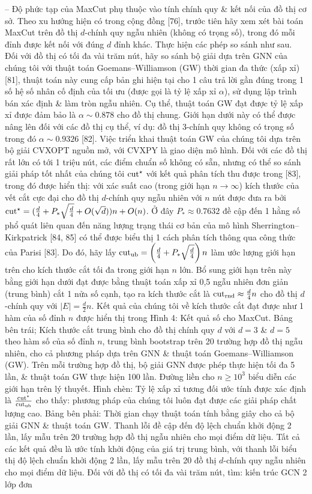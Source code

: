 \documentclass{article}
\begin{document}
\begin{itemize}
    -- Độ phức tạp của MaxCut phụ thuộc vào tính chính quy \& kết nối của đồ thị cơ sở. Theo xu hướng hiện có trong cộng đồng [76], trước tiên hãy xem xét bài toán MaxCut trên đồ thị $d$-chính quy ngẫu nhiên (không có trọng số), trong đó mỗi đỉnh được kết nối với đúng $d$ đỉnh khác. Thực hiện các phép so sánh như sau. Đối với đồ thị có tối đa vài trăm nút, hãy so sánh bộ giải dựa trên GNN của chúng tôi với thuật toán Goemans--Williamson (GW) thời gian đa thức (xấp xỉ) [81], thuật toán này cung cấp bản ghi hiện tại cho 1 câu trả lời gần đúng trong 1 số hệ số nhân cố định của tối ưu (được gọi là tỷ lệ xấp xỉ $\alpha$), sử dụng lập trình bán xác định \& làm tròn ngẫu nhiên. Cụ thể, thuật toán GW đạt được tỷ lệ xấp xỉ được đảm bảo là $\alpha\sim0.878$ cho đồ thị chung. Giới hạn dưới này có thể được nâng lên đối với các đồ thị cụ thể, ví dụ: đồ thị 3-chính quy không có trọng số trong đó $\alpha\sim0.9326$ [82]. Việc triển khai thuật toán GW của chúng tôi dựa trên bộ giải CVXOPT nguồn mở, với CVXPY là giao diện mô hình. Đối với các đồ thị rất lớn có tới 1 triệu nút, các điểm chuẩn số không có sẵn, nhưng có thể so sánh giải pháp tốt nhất của chúng tôi ${\rm cut}^\star$ với kết quả phân tích thu được trong [83], trong đó được hiển thị: với xác suất cao (trong giới hạn $n\to\infty$) kích thước của vết cắt cực đại cho đồ thị $d$-chính quy ngẫu nhiên với $n$ nút được đưa ra bởi ${\rm cut}^\star = (\frac{d}{4} + P_*\sqrt{\frac{d}{4}} + O(\sqrt{d}))n + O(n)$. Ở đây $P_*\approx0.7632$ đề cập đến 1 hằng số phổ quát liên quan đến năng lượng trạng thái cơ bản của mô hình Sherrington--Kirkpatrick [84, 85] có thể được biểu thị 1 cách phân tích thông qua công thức của Parisi [83]. Do đó, hãy lấy ${\rm cut}_{\rm ub} = \left(\frac{d}{4} + P_*\sqrt{\frac{d}{4}}\right)n$ làm ước lượng giới hạn trên cho kích thước cắt tối đa trong giới hạn $n$ lớn. Bổ sung giới hạn trên này bằng giới hạn dưới đạt được bằng thuật toán xấp xỉ 0,5 ngẫu nhiên đơn giản (trung bình) cắt 1 nửa số cạnh, tạo ra kích thước cắt là ${\rm cut}_{\rm rnd}\approx\frac{d}{4}n$ cho đồ thị $d$-chính quy với $|E| = \frac{d}{2}n$. Kết quả của chúng tôi về kích thước cắt đạt được như 1 hàm của số đỉnh $n$ được hiển thị trong {\sf Hình 4: Kết quả số cho MaxCut. Bảng bên trái; Kích thước cắt trung bình cho đồ thị chính quy $d$ với $d = 3$ \& $d = 5$ theo hàm số của số đỉnh $n$, trung bình bootstrap trên 20 trường hợp đồ thị ngẫu nhiên, cho cả phương pháp dựa trên GNN \& thuật toán Goemans--Williamson (GW). Trên mỗi trường hợp đồ thị, bộ giải GNN được phép thực hiện tối đa 5 lần, \& thuật toán GW thực hiện 100 lần. Đường liền cho $n\ge10^3$ biểu diễn các giới hạn trên lý thuyết. Hình chèn: Tỷ lệ xấp xỉ tương đối ước tính được xác định là $\frac{{\rm cut}^\star}{{\rm cut}_{\rm ub}}$ cho thấy: phương pháp của chúng tôi luôn đạt được các giải pháp chất lượng cao. Bảng bên phải: Thời gian chạy thuật toán tính bằng giây cho cả bộ giải GNN \& thuật toán GW. Thanh lỗi đề cập đến độ lệch chuẩn khởi động 2 lần, lấy mẫu trên 20 trường hợp đồ thị ngẫu nhiên cho mọi điểm dữ liệu.} Tất cả các kết quả đều là ước tính khởi động của giá trị trung bình, với thanh lỗi biểu thị độ lệch chuẩn khởi động 2 lần, lấy mẫu trên 20 đồ thị $d$-chính quy ngẫu nhiên cho mọi điểm dữ liệu. Đối với đồ thị có tối đa vài trăm nút, tìm: kiến trúc GCN 2 lớp đơn 
\end{itemize}
\end{document}
